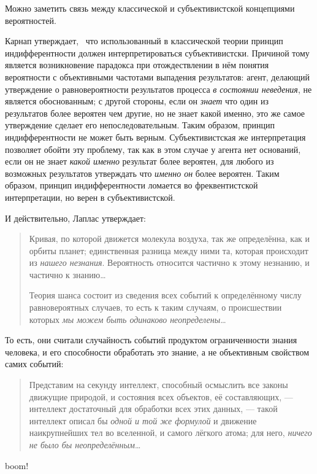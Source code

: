 \documentclass[14pt, a4paper, pdftex]{extarticle}
\begin{document}
\begin{Remark}
Можно заметить связь между классической и субъективистской концепциями вероятностей.

Карнап утверждает,~\cite[стр. 5]{Carnap} что использованный в классической теории принцип индифферентности должен интерпретироваться субъективистски. Причиной тому является возникновение парадокса при отождествлении в нём понятия вероятности с объективными частотами выпадения результатов: агент, делающий утверждение о равновероятности результатов процесса \emph{в состоянии неведения}, не является обоснованным; с другой стороны, если он \emph{знает} что один из результатов более вероятен чем другие, но не знает какой именно, это же самое утверждение сделает его непоследовательным. Таким образом, принцип индифферентности не может быть верным. Субъективистская же интерпретация позволяет обойти эту проблему, так как в этом случае у агента нет оснований, если он не знает \emph{какой именно} результат более вероятен, для любого из возможных результатов утверждать что \emph{именно он} более вероятен. Таким образом, принцип индифферентности ломается во фреквентистской интерпретации, но верен в субъективистской.

И действительно, Лаплас утверждает:~\cite[стр. 6]{Laplace}
\begin{quote}
Кривая, по которой движется молекула воздуха, так же определённа, как и орбиты планет; единственная разница между ними та, которая происходит из \emph{нашего незнания}. Вероятность относится частично к этому незнанию, и частично к знанию\dots

Теория шанса состоит из сведения всех событий к определённому числу равновероятных случаев, то есть к таким случаям, о происшествии которых \emph{мы можем быть одинаково неопределены}\dots
\end{quote}

То есть, они считали случайность событий продуктом ограниченности знания человека, и его способности обработать это знание, а не объективным свойством самих событий:~\cite[стр. 4]{Laplace}
\begin{quote}
Представим на секунду интеллект, способный осмыслить все законы движущие природой, и состояния всех объектов, её составляющих, --- интеллект достаточный для обработки всех этих данных, --- такой интеллект описал бы \emph{одной и той же формулой} и движение наикрупнейших тел во вселенной, и самого лёгкого атома; для него, \emph{ничего не было бы неопределённым}\dots
\end{quote}
{\color{white}boom!}
\end{Remark}
\end{document}
